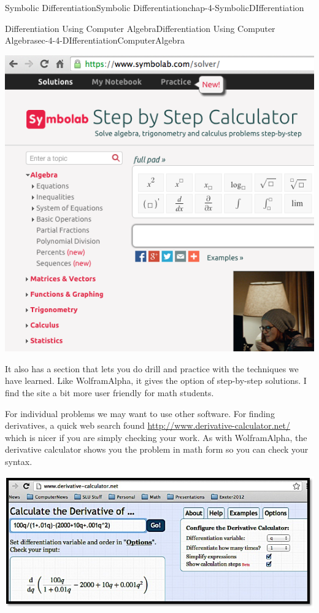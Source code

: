 \documentclass[oneside,10pt,]{book}
\numberwithin{equation}{section}
\begin{document}
\begin{chapterptx}{Symbolic Differentiation}{}{Symbolic Differentiation}{}{}{chap-4-SymbolicDIfferentiation}
\begin{sectionptx}{Differentiation Using Computer Algebra}{}{Differentiation Using Computer Algebra}{}{}{sec-4-4-DIfferentiationComputerAlgebra}
\begin{sidebyside}{1}{0.15}{0.15}{0}%
\begin{sbspanel}{0.7}%
\includegraphics[width=1\linewidth]{images/sec4-4-8.png}
\end{sbspanel}%
\end{sidebyside}%
\par
\hypertarget{p-1736}{}%
It also has a section that lets you do drill and practice with the techniques we have learned.  Like WolframAlpha, it gives the option of step-by-step solutions.  I find the site a bit more user friendly for math students.%
\par
\hypertarget{p-1737}{}%
For individual problems we may want to use other software.  For finding derivatives, a quick web search found \href{http://www.derivative-calculator.net/}{http:\slash{}\slash{}www.derivative-calculator.net\slash{}} which is nicer if you are simply checking your work.  As with Wolfram\textbar{}Alpha, the derivative calculator shows you the problem in math form so you can check your syntax.%
\begin{sidebyside}{1}{0.05}{0.05}{0}%
\begin{sbspanel}{0.9}%
\includegraphics[width=1\linewidth]{images/sec4-4-9.png}

\end{sbspanel}
\end{sidebyside}
\end{sectionptx}
\end{chapterptx}
\end{document}
